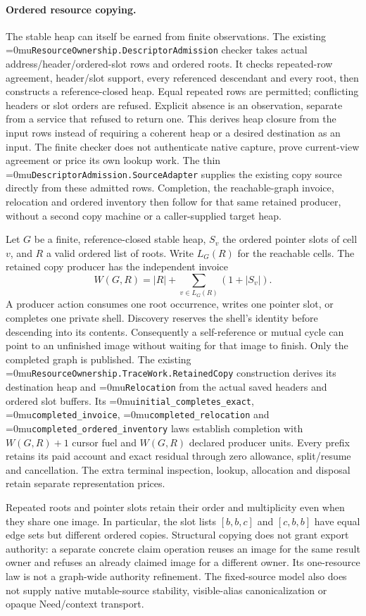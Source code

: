 \documentclass[11pt]{article}
\newcommand{\leanname}[1]{\textup{\Urlmuskip=0mu\relax\nolinkurl{#1}}}
\theoremstyle{definition}
\theoremstyle{remark}
\begin{document}
\paragraph{Ordered resource copying.}
The stable heap can itself be earned from finite observations. The existing
\leanname{ResourceOwnership.DescriptorAdmission} checker takes actual
address/header/ordered-slot rows and ordered roots. It checks repeated-row
agreement, header/slot support, every referenced descendant and every root,
then constructs a reference-closed heap. Equal repeated rows are permitted;
conflicting headers or slot orders are refused. Explicit absence is an
observation, separate from a service that refused to return one. This derives
heap closure from the input rows instead of requiring a coherent heap or a
desired destination as an input. The finite checker does not authenticate
native capture, prove current-view agreement or price its own lookup work.
The thin \leanname{DescriptorAdmission.SourceAdapter} supplies the existing
copy source directly from these admitted rows. Completion, the reachable-graph
invoice, relocation and ordered inventory then follow for that same retained
producer, without a second copy machine or a caller-supplied target heap.

Let $G$ be a finite, reference-closed stable heap, $S_v$ the ordered pointer
slots of cell $v$, and $R$ a valid ordered list of roots. Write $L_G(R)$ for
the reachable cells. The retained copy producer has the independent invoice
\[
  W(G,R)=|R|+\sum_{v\in L_G(R)}(1+|S_v|).
\]
A producer action consumes one root occurrence, writes one pointer slot, or
completes one private shell. Discovery reserves the shell's identity before
descending into its contents. Consequently a self-reference or mutual cycle
can point to an unfinished image without waiting for that image to finish.
Only the completed graph is published. The existing
\leanname{ResourceOwnership.TraceWork.RetainedCopy} construction derives its
destination heap and \leanname{Relocation} from the actual saved headers and
ordered slot buffers. Its \leanname{initial_completes_exact},
\leanname{completed_invoice}, \leanname{completed_relocation} and
\leanname{completed_ordered_inventory} laws establish completion with
$W(G,R)+1$ cursor fuel and $W(G,R)$ declared producer units. Every prefix
retains its paid account and exact residual through zero allowance,
split/resume and cancellation. The extra terminal inspection, lookup,
allocation and disposal retain separate representation prices.

Repeated roots and pointer slots retain their order and multiplicity even
when they share one image. In particular, the slot lists $[b,b,c]$ and
$[c,b,b]$ have equal edge sets but different ordered copies. Structural copying
does not grant export authority: a separate concrete claim operation reuses
an image for the same result owner and refuses an already claimed image for
a different owner. Its one-resource law is not a graph-wide authority
refinement. The fixed-source model also does not supply native mutable-source
stability, visible-alias canonicalization or opaque Need/context transport.
\end{document}

